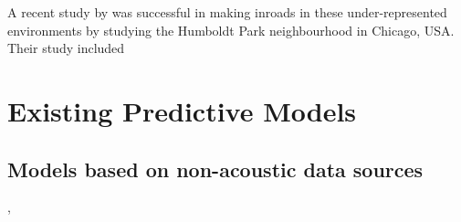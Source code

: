     A recent study by \cite{Kou2020effects} was successful in making inroads in these under-represented environments by studying the Humboldt Park neighbourhood in Chicago, USA. Their study included

\section{Existing Predictive Models}

  \citep{Lionello2020systematic}

  \subsection{Models based on non-acoustic data sources}
    \citep{Verma2020Predicting}, \citep{Gasco2020Social}
